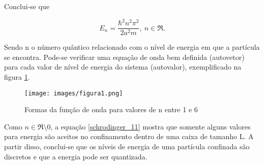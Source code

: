   \par Conclui-se que

  \begin{equation}
    \label{schrodinger_11}
    E_{n} = \frac{\hbar^2 n^2 \pi^2}{2a^2m},\ n\in\Re.
  \end{equation}

  \par Sendo n o número quântico relacionado com o nível de energia em que a partícula se encontra. Pode-se verificar uma equação de onda bem definida (autovetor) para cada valor de nível de energia do sistema (autovalor), exemplificado na figura \ref{fig1}.

    \begin{figure}[H]
      \caption{Formas da função de onda para valores de n entre 1 e 6\cite{frustrado2}}
      \centering
      \texttt{[image: images/figura1.png]}
      \label{fig1}
    \end{figure}

    \par Como $n \in \Re\setminus 0$, a equação \eqref{schrodinger_11} mostra que somente alguns valores para energia são aceitos no confinamento dentro de uma caixa de tamanho L. A partir disso, conclui-se que os níveis de energia de uma partícula confinada são discretos e que a energia pode ser quantizada\cite{frustrado2}.















    